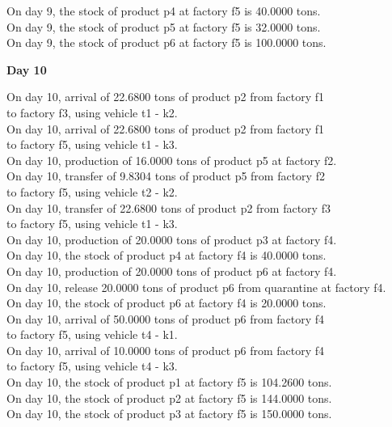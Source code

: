\begin{table}[H]
\begin{multicols}{2}
\begin{tabbing}
On day 9, the stock of product p4 at factory f5 is 40.0000 tons. \\
On day 9, the stock of product p5 at factory f5 is 32.0000 tons. \\
On day 9, the stock of product p6 at factory f5 is 100.0000 tons. \\
\end{tabbing} \vspace{-2.0em}
\textbf{Day 10}
\vspace{-1.6em}
\begin{tabbing}
On day 10, arrival of 22.6800 tons of product p2 from factory f1 \\ to factory f3, using vehicle t1 - k2. \\
On day 10, arrival of 22.6800 tons of product p2 from factory f1 \\ to factory f5, using vehicle t1 - k3. \\
On day 10, production of 16.0000 tons of product p5 at factory f2. \\
On day 10, transfer of 9.8304 tons of product p5 from factory f2 \\ to factory f5, using vehicle t2 - k2. \\
On day 10, transfer of 22.6800 tons of product p2 from factory f3 \\ to factory f5, using vehicle t1 - k3. \\
On day 10, production of 20.0000 tons of product p3 at factory f4. \\
On day 10, the stock of product p4 at factory f4 is 40.0000 tons. \\
On day 10, production of 20.0000 tons of product p6 at factory f4. \\
On day 10, release 20.0000 tons of product p6 from quarantine at factory f4. \\
On day 10, the stock of product p6 at factory f4 is 20.0000 tons. \\
On day 10, arrival of 50.0000 tons of product p6 from factory f4 \\ to factory f5, using vehicle t4 - k1. \\
On day 10, arrival of 10.0000 tons of product p6 from factory f4 \\ to factory f5, using vehicle t4 - k3. \\
On day 10, the stock of product p1 at factory f5 is 104.2600 tons. \\
On day 10, the stock of product p2 at factory f5 is 144.0000 tons. \\
On day 10, the stock of product p3 at factory f5 is 150.0000 tons. \\

\end{tabbing}
\end{multicols}
\end{table}
